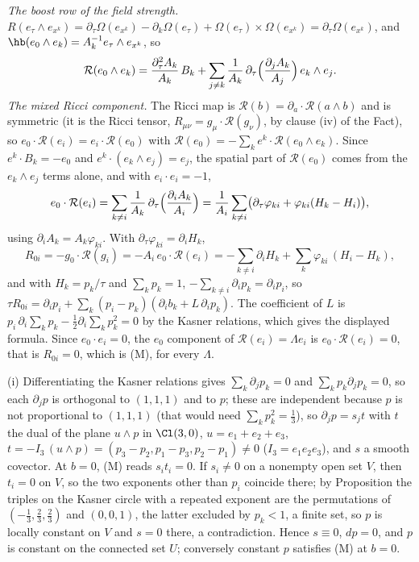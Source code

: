 \emph{The boost row of the field strength.} $R(e_{\tau}\wedge e_{x^{k}}) = \partial_{\tau}\Omega(e_{x^{k}}) - \partial_{k}\Omega(e_{\tau}) + \Omega(e_{\tau})\times\Omega(e_{x^{k}}) = \partial_{\tau}\Omega(e_{x^{k}})$, and $\hb(e_{0}\wedge e_{k}) = A_{k}^{-1}e_{\tau}\wedge e_{x^{k}}$, so
\[
\mathcal{R}(e_{0}\wedge e_{k}) = \frac{\partial_{\tau}^{2}A_{k}}{A_{k}}\,B_{k} + \sum_{j \neq k}\frac{1}{A_{k}}\,\partial_{\tau}\Bigl(\frac{\partial_{j}A_{k}}{A_{j}}\Bigr)\,e_{k}\wedge e_{j}.
\]
\emph{The mixed Ricci component.} The Ricci map is $\mathcal{R}(b) = \partial_{a}\cdot\mathcal{R}(a\wedge b)$ and is symmetric (it is the Ricci tensor, $R_{\mu\nu} = g_{\mu}\cdot\mathcal{R}(g_{\nu})$, by clause (iv) of the Fact), so $e_{0}\cdot\mathcal{R}(e_{i}) = e_{i}\cdot\mathcal{R}(e_{0})$ with $\mathcal{R}(e_{0}) = -\sum_{k}e^{k}\cdot\mathcal{R}(e_{0}\wedge e_{k})$. Since $e^{k}\cdot B_{k} = -e_{0}$ and $e^{k}\cdot(e_{k}\wedge e_{j}) = e_{j}$, the spatial part of $\mathcal{R}(e_{0})$ comes from the $e_{k}\wedge e_{j}$ terms alone, and with $e_{i}\cdot e_{i} = -1$,
\[
e_{0}\cdot\mathcal{R}(e_{i}) = \sum_{k \neq i}\frac{1}{A_{k}}\,\partial_{\tau}\Bigl(\frac{\partial_{i}A_{k}}{A_{i}}\Bigr) = \frac{1}{A_{i}}\sum_{k \neq i}\bigl(\partial_{\tau}\varphi_{ki} + \varphi_{ki}(H_{k} - H_{i})\bigr),
\]
using $\partial_{i}A_{k} = A_{k}\varphi_{ki}$. With $\partial_{\tau}\varphi_{ki} = \partial_{i}H_{k}$,
\[
R_{0i} = -g_{0}\cdot\mathcal{R}(g_{i}) = -A_{i}\,e_{0}\cdot\mathcal{R}(e_{i}) = -\sum_{k \neq i}\partial_{i}H_{k} + \sum_{k}\varphi_{ki}\,(H_{i} - H_{k}),
\]
and with $H_{k} = p_{k}/\tau$ and $\sum_{k}p_{k} = 1$, $-\sum_{k \neq i}\partial_{i}p_{k} = \partial_{i}p_{i}$, so $\tau R_{0i} = \partial_{i}p_{i} + \sum_{k}(p_{i} - p_{k})(\partial_{i}b_{k} + L\,\partial_{i}p_{k})$. The coefficient of $L$ is $p_{i}\,\partial_{i}\sum_{k}p_{k} - \tfrac12\partial_{i}\sum_{k}p_{k}^{2} = 0$ by the Kasner relations, which gives the displayed formula. Since $e_{0}\cdot e_{i} = 0$, the $e_{0}$ component of $\mathcal{R}(e_{i}) = \Lambda e_{i}$ is $e_{0}\cdot\mathcal{R}(e_{i}) = 0$, that is $R_{0i} = 0$, which is (M), for every $\Lambda$.

(i) Differentiating the Kasner relations gives $\sum_{k}\partial_{j}p_{k} = 0$ and $\sum_{k}p_{k}\partial_{j}p_{k} = 0$, so each $\partial_{j}p$ is orthogonal to $(1,1,1)$ and to $p$; these are independent because $p$ is not proportional to $(1,1,1)$ (that would need $\sum_{k}p_{k}^{2} = \tfrac13$), so $\partial_{j}p = s_{j}t$ with $t$ the dual of the plane $u \wedge p$ in $\Cl(3,0)$, $u = e_{1} + e_{2} + e_{3}$, $t = -I_{3}\,(u \wedge p) = (p_{3} - p_{2}, p_{1} - p_{3}, p_{2} - p_{1}) \neq 0$ ($I_{3} = e_{1}e_{2}e_{3}$), and $s$ a smooth covector. At $b = 0$, (M) reads $s_{i}t_{i} = 0$. If $s_{i} \neq 0$ on a nonempty open set $V$, then $t_{i} = 0$ on $V$, so the two exponents other than $p_{i}$ coincide there; by Proposition  the triples on the Kasner circle with a repeated exponent are the permutations of $(-\tfrac13, \tfrac23, \tfrac23)$ and $(0, 0, 1)$, the latter excluded by $p_{k} < 1$, a finite set, so $p$ is locally constant on $V$ and $s = 0$ there, a contradiction. Hence $s \equiv 0$, $dp = 0$, and $p$ is constant on the connected set $U$; conversely constant $p$ satisfies (M) at $b = 0$.


